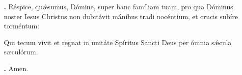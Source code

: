 
\textbf{\Vbar.} Réspice, qu\'{\ae}sumus, Dómine, super hanc famíliam tuam, pro qua Dóminus noster Iesus Christus non dubitávit mánibus tradi nocéntium, et crucis subíre torméntum:


Qui tecum vivit et regnat in unitáte Spíritus Sancti Deus per ómnia s\'{\ae}cula sæculórum.

\textbf{\Rbar.} Amen.

